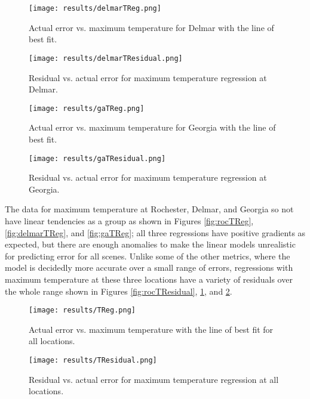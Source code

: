 \documentclass{book}
\begin{document}
\begin{figure}[H]
\begin{minipage}[b]{0.47\textwidth}
\centering
\texttt{[image: results/delmarTReg.png]}
\caption{Actual error vs. maximum temperature for Delmar with the line of best fit.}
\label{fig:delmarTReg}
\end{minipage}
\begin{minipage}[b]{0.47\textwidth}
\centering
\texttt{[image: results/delmarTResidual.png]}
\caption{Residual vs. actual error for maximum temperature regression at Delmar.}
\label{fig:delmarTResidual}
\end{minipage}
\end{figure}

\begin{figure}[H]
\begin{minipage}[b]{0.47\textwidth}
\centering
\texttt{[image: results/gaTReg.png]}
\caption{Actual error vs. maximum temperature for Georgia with the line of best fit.}
\label{fig:gaTReg}
\end{minipage}
\begin{minipage}[b]{0.47\textwidth}
\centering
\texttt{[image: results/gaTResidual.png]}
\caption{Residual vs. actual error for maximum temperature regression at Georgia.}
\label{fig:gaTResidual}
\end{minipage}
\end{figure}

The data for maximum temperature at Rochester, Delmar, and Georgia so not have linear tendencies as a group as shown in Figures \ref{fig:rocTReg}, \ref{fig:delmarTReg}, and \ref{fig:gaTReg}; all three regressions have positive gradients as expected, but there are enough anomalies to make the linear models unrealistic for predicting error for all scenes.  Unlike some of the other metrics, where the model is decidedly more accurate over a small range of errors, regressions with maximum temperature at these three locations have a variety of residuals over the whole range shown in Figures \ref{fig:rocTResidual}, \ref{fig:delmarTResidual}, and \ref{fig:gaTResidual}.

\begin{figure}[H]
\begin{minipage}[b]{0.47\textwidth}
\centering
\texttt{[image: results/TReg.png]}
\caption{Actual error vs. maximum temperature with the line of best fit for all locations.}
\label{fig:TReg}
\end{minipage}
\begin{minipage}[b]{0.47\textwidth}
\centering
\texttt{[image: results/TResidual.png]}
\caption{Residual vs. actual error for maximum temperature regression at all \\ locations.}
\label{fig:TResidual}
\end{minipage}
\end{figure}
\end{document}

